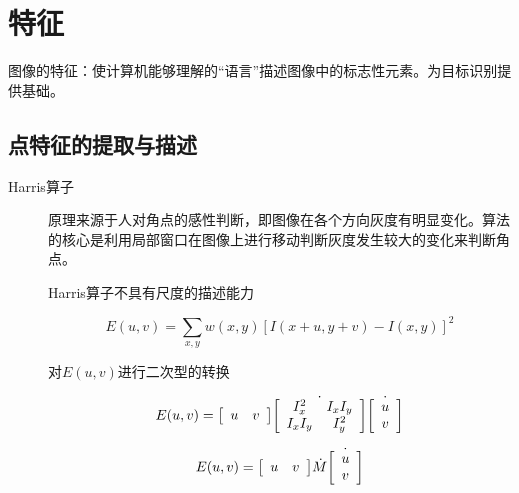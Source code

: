 \documentclass[a4paper,16pt,UTF8]{article}
\begin{document}
\section{\LARGE 特征}

图像的特征：使计算机能够理解的“语言”描述图像中的标志性元素。为目标识别提供基础。

\subsection{\Large 点特征的提取与描述}

\begin{flushleft}
    \begin{description}
        \item[Harris算子]

        原理来源于人对角点的感性判断，即图像在各个方向灰度有明显变化。算法的核心是利用局部窗口在图像上进行移动判断灰度发生较大的变化来判断角点。

        Harris算子不具有尺度的描述能力

        \begin{equation*}
            E(u,v) = \sum_{x,y}w(x,y)\left[I(x+u,y+v) - I(x,y) \right]^{2}
        \end{equation*}

        对$E(u,v)$进行二次型的转换

        \begin{equation*}
            E(u,v) = 
            {\left[
                \begin{array}{c c}
                    u & v
                \end{array}
            \right]}
            \dot 
            {\left[
                \begin{array}{c c}
                    I_{x}^{2} & I_{x}I_{y} \\
                    I_{x}I_{y} & I_{y}^{2}
                \end{array}
             \right]}
            \dot
            {\left[
                \begin{array}{c}
                    u \\
                    v
                \end{array}
            \right]}
        \end{equation*}
        
        \begin{equation*}
            E(u,v) = 
            {\left[
                \begin{array}{c c}
                    u & v
                \end{array}
            \right]}
            \dot 
            M
            \dot
            {\left[
                \begin{array}{c}
                    u \\
                    v
                \end{array}
            \right]}
        \end{equation*}


\end{description}
\end{flushleft}
\end{document}
